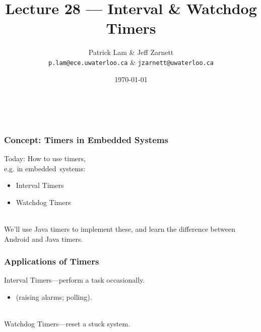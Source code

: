 

\title{Lecture 28 --- Interval \& Watchdog Timers}

\author{Patrick Lam \& Jeff Zarnett\\ \small \texttt{p.lam@ece.uwaterloo.ca} \& \texttt{jzarnett@uwaterloo.ca}}
\date{\today}



\begin{frame}
  \titlepage

  \vfill
  \begin{center}
    \\
                  {\tiny\CcNote{\CcLongnameByNcSa}}
                  \vspace*{-2.5ex}
  \end{center}

\end{frame}


\begin{frame}
\frametitle{Concept: Timers in Embedded Systems}

\begin{changemargin}{1cm}
\large

Today: How to use timers,\\ \qquad \qquad e.g. in embedded~systems:
\begin{itemize}
\item Interval Timers
\item Watchdog Timers
\end{itemize}
~\\
We'll use Java timers to implement these,
and learn the difference between Android and Java timers.

\end{changemargin}

\end{frame}

\begin{frame}
\frametitle{Applications of Timers}

\Large
\begin{changemargin}{1.3cm}
Interval Timers---perform a task occasionally.\\[-0.5em]
\begin{itemize}\item (raising alarms; polling).
\end{itemize}
~\\
Watchdog Timers---reset a stuck system.
~\\[1em]

\end{changemargin}

\end{frame}


